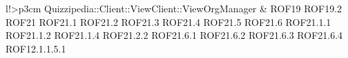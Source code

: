 \begin{tabella}{l!{\VRule}>{\centering\arraybackslash}p{3cm}}
Quizzipedia::Client::ViewClient::ViewOrgManager & ROF19 \linebreak ROF19.2 \linebreak ROF21 \linebreak ROF21.1 \linebreak ROF21.2 \linebreak ROF21.3 \linebreak ROF21.4 \linebreak ROF21.5 \linebreak ROF21.6 \linebreak ROF21.1.1 \linebreak ROF21.1.2 \linebreak ROF21.1.4 \linebreak ROF21.2.2 \linebreak ROF21.6.1 \linebreak ROF21.6.2 \linebreak ROF21.6.3 \linebreak ROF21.6.4 \linebreak ROF12.1.1.5.1 \\

\end{tabella}
